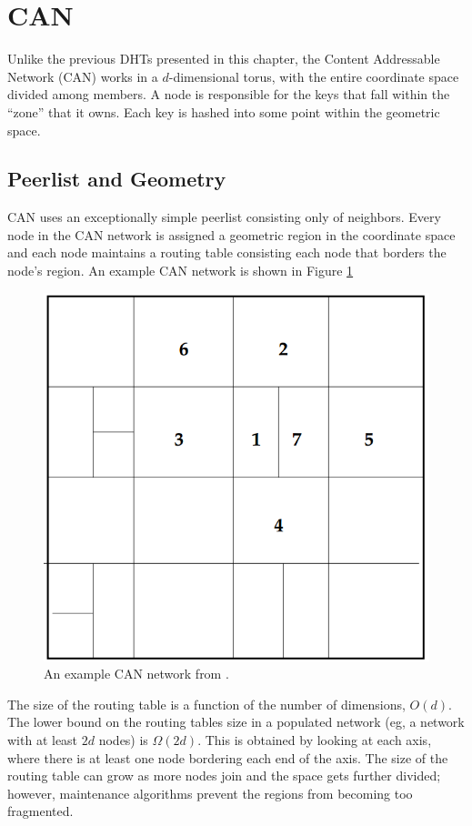 \section{CAN}


Unlike the previous DHTs presented in this chapter, the Content Addressable Network (CAN) \cite{can} works in a $d$-dimensional torus, with the entire coordinate space divided among members.
A node is responsible for the keys  that fall within the ``zone'' that it owns.
Each key is hashed into some point within the geometric space.

\subsection*{Peerlist and Geometry}
CAN uses an exceptionally simple peerlist consisting only of neighbors.  
Every node in the CAN network is assigned a geometric region in the coordinate space and each node maintains a routing table consisting each node that borders the node's region.
An example CAN network is shown in Figure \ref{fig:can}


\begin{figure}
	\centering
	\includegraphics[width=0.7\linewidth]{figs/can}
	\caption{An example CAN network from \cite{can}.}
	\label{fig:can}
\end{figure}


The size of the routing table is a function of the number of dimensions, $O(d)$. 
The lower bound on the routing tables size in a populated network (eg, a network with at least $2d$ nodes) is $\Omega(2d)$.  
This is obtained by looking at each axis, where there is at least one node bordering each end of the axis.
The size of the routing table can grow as more nodes join and the space gets further divided; however, maintenance algorithms prevent the regions from becoming too fragmented.


